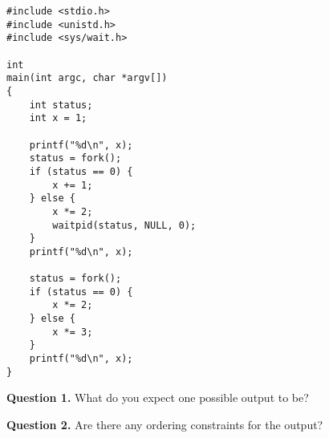 \documentclass[letterpaper,twocolumn,10pt]{article}
\begin{document}
\begin{lstlisting}[style=CStyle]
#include <stdio.h>
#include <unistd.h>
#include <sys/wait.h>

int
main(int argc, char *argv[])
{
    int status;
    int x = 1;

    printf("%d\n", x);
    status = fork();
    if (status == 0) {
        x += 1;
    } else {
        x *= 2;
        waitpid(status, NULL, 0);
    }
    printf("%d\n", x);

    status = fork();
    if (status == 0) {
        x *= 2;
    } else {
        x *= 3;
    }
    printf("%d\n", x);
}
\end{lstlisting}

\break

\noindent
\textbf{Question 1.} What do you expect one possible output to be?

\vspace{16em}

\noindent
\textbf{Question 2.} Are there any ordering constraints for the output?

\vspace{16em}
\end{document}
